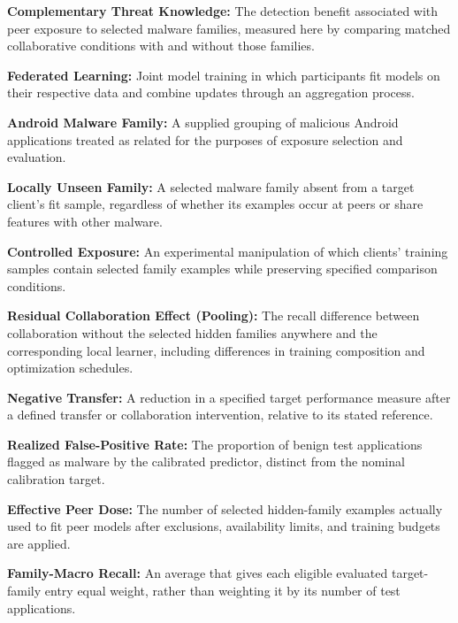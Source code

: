 \documentclass[12pt,letterpaper]{article}
\begin{document}
\textbf{Complementary Threat Knowledge:} The detection benefit associated with peer exposure to selected malware families, measured here by comparing matched collaborative conditions with and without those families.

\textbf{Federated Learning:} Joint model training in which participants fit models on their respective data and combine updates through an aggregation process.

\textbf{Android Malware Family:} A supplied grouping of malicious Android applications treated as related for the purposes of exposure selection and evaluation.

\textbf{Locally Unseen Family:} A selected malware family absent from a target client's fit sample, regardless of whether its examples occur at peers or share features with other malware.

\textbf{Controlled Exposure:} An experimental manipulation of which clients' training samples contain selected family examples while preserving specified comparison conditions.

\textbf{Residual Collaboration Effect (Pooling):} The recall difference between collaboration without the selected hidden families anywhere and the corresponding local learner, including differences in training composition and optimization schedules.

\textbf{Negative Transfer:} A reduction in a specified target performance measure after a defined transfer or collaboration intervention, relative to its stated reference.

\textbf{Realized False-Positive Rate:} The proportion of benign test applications flagged as malware by the calibrated predictor, distinct from the nominal calibration target.

\textbf{Effective Peer Dose:} The number of selected hidden-family examples actually used to fit peer models after exclusions, availability limits, and training budgets are applied.

\textbf{Family-Macro Recall:} An average that gives each eligible evaluated target-family entry equal weight, rather than weighting it by its number of test applications.
\end{document}
